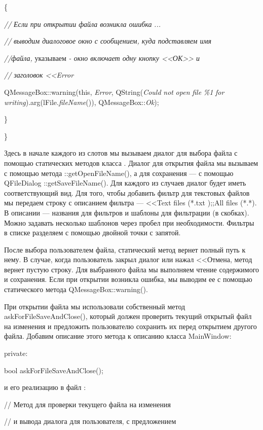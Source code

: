 \{

\textit{//} \textit{Если при открытии файла возникла ошибка}\textit{ }\textit{...}

\textit{//} \textit{выводим диалоговое окно с сообщением, куда подставляем имя}

\textit{//файла}\textit{,} указываем\textit{ - окно включает одну кнопку <<ОК>> и}

{\itshape
// заголовок <<Error}

 QMessageBox::warning(this, \textit{Error}, QString(\textit{Could} \textit{not} \textit{open}
\textit{file} \textit{\%1} \textit{for} \textit{writing}).arg(lFile.\textit{fileName}()),
QMessageBox::\textit{Ok});

\}

\}

Здесь в начале каждого из слотов мы вызываем диалог для выбора файла с помощью статических методов класса .
Диалог для открытия файла мы вызываем с помощью метода ::getOpenFileName(), а для сохранения --- с помощью
QFileDialog ::getSaveFileName(). Для каждого из случаев диалог будет иметь соответствующий вид. Для того, чтобы
добавить фильтр для текстовых файлов мы передаем строку с описанием фильтра --- <<Text files (*.txt );;All files
(*.*). В описании --- названия для фильтров и шаблоны для фильтрации (в скобках). Можно задавать несколько
шаблонов через пробел при необходимости. Фильтры в списке разделяем с помощью двойной точки с запятой. 

После выбора пользователем файла, статический метод вернет полный путь к нему. В случае, когда пользователь закрыл
диалог или нажал <<Отмена, метод вернет пустую строку. Для выбранного файла мы выполняем чтение
содержимого и сохранения. Если при открытии возникла ошибка, мы выводим ее с помощью статического метода
QMessageBox::warning(). 

При открытии файла мы использовали собственный метод askForFileSaveAndClose(), который должен проверить текущий открытый
файл на изменения и предложить пользователю сохранить их перед открытием другого файла. Добавим описание этого метода к
описанию класса MainWindow: 

private:

 bool askForFileSaveAndClose();

и его реализацию в файл  :

// Метод для проверки текущего файла на изменения 

// и вывода диалога для пользователя, с предложением 

